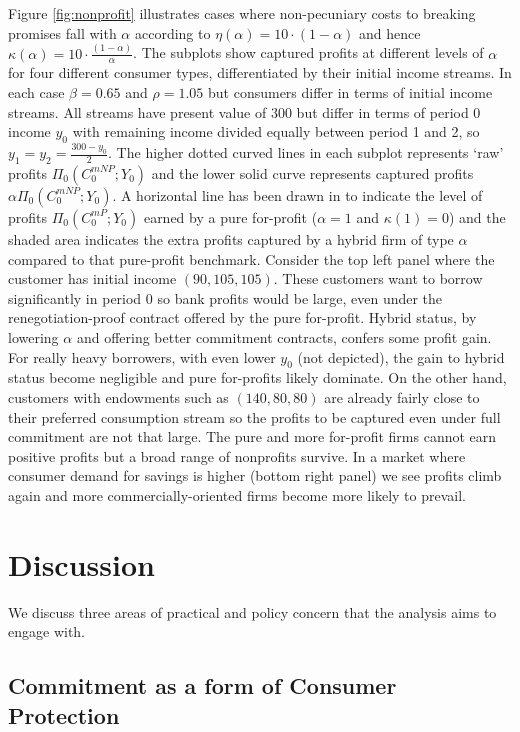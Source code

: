 \documentclass[11pt,english]{article}
\theoremstyle{plain}
\theoremstyle{definition}
\begin{document}
Figure \ref{fig:nonprofit} illustrates cases where non-pecuniary
costs to breaking promises fall with $\alpha$
according to $\eta(\alpha)=10 \cdot (1-\alpha)$ and hence $\kappa(\alpha)=10 \cdot \frac{(1-\alpha)}{\alpha}$.
The subplots show captured profits at different
levels of $\alpha$ for four  different consumer types, differentiated by their initial income streams. In each case \(\beta=0.65\) and $\rho=1.05$ but consumers differ in terms of initial  income streams. All streams have present value of 300
but differ  in terms of period 0 income \(y_{0}\) with remaining income  divided equally between period 1 and 2, so \(y_1=y_2=\frac{300-y_0}{2}\). 
 The higher dotted curved lines in each subplot
represents `raw' profits $\Pi_{0}(C_{0}^{mNP};Y_{0})$ and the lower
solid curve represents captured profits $\alpha\Pi_{0}(C_{0}^{mNP};Y_{0})$. A horizontal
line has been drawn in to indicate the level of profits $\Pi_{0}(C_{0}^{mP};Y_{0})$
earned by a pure for-profit ($\alpha=1$ and $\kappa (1)=0$) and the shaded area indicates the extra profits captured by a hybrid firm of type \(\alpha\) compared to that pure-profit benchmark. Consider the top left panel
where the customer has initial income $(90,105,105)$. These  customers want to borrow significantly in period 0 so bank
profits would be large, even under the renegotiation-proof contract offered by the pure for-profit. Hybrid status, by lowering $\alpha$ and offering better commitment contracts, confers some profit gain.
For really heavy borrowers, with even lower \(y_{0}\) (not depicted), the gain to hybrid status become negligible  and  pure for-profits likely dominate. On the other hand, customers with endowments such as  $(140,80,80)$ are already fairly close
to their preferred consumption stream so the profits to be captured
even under full commitment are not that large. The pure and more for-profit firms cannot  earn positive profits but a broad range of nonprofits survive.  In a market where consumer demand for savings is higher (bottom right panel) we see  profits climb again and more commercially-oriented firms become more likely to prevail. 

\section{Discussion}

We discuss three areas of practical and policy concern that the
analysis aims to engage with.

\subsection{Commitment as a form of Consumer Protection}
\end{document}
